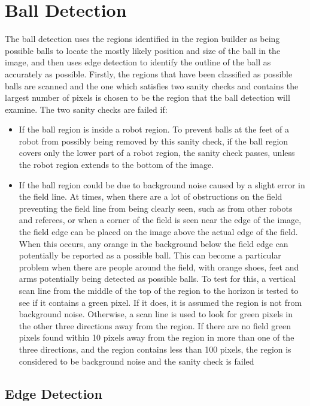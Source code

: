 \documentclass[pdftex,11pt,a4paper]{report}
\begin{document}
\section{Ball Detection} \label{sectionBallDetection}
The ball detection uses the regions identified in the region builder as being possible balls to locate the mostly likely position and size of the ball in the image, and then uses edge detection to identify the outline of the ball as accurately as possible. Firstly, the regions that have been classified as possible balls are scanned and the one which satisfies two sanity checks and contains the largest number of pixels is chosen to be the region that the ball detection will examine. The two sanity checks are failed if: \begin{itemize}
\item{If the ball region is inside a robot region. To prevent balls at the feet of a robot from possibly being removed by this sanity check, if the ball region covers only the lower part of a robot region, the sanity check passes, unless the robot region extends to the bottom of the image.}
\item{If the ball region could be due to background noise caused by a slight error in the field line. At times, when there are a lot of obstructions on the field preventing the field line from being clearly seen, such as from other robots and referees, or when a corner of the field is seen near the edge of the image, the field edge can be placed on the image above the actual edge of the field. When this occurs, any orange in the background below the field edge can potentially be reported as a possible ball. This can become a particular problem when there are people around the field, with orange shoes, feet and arms potentially being detected as possible balls. To test for this, a vertical scan line from the middle of the top of the region to the horizon is tested to see if it contains a green pixel. If it does, it is assumed the region is not from background noise. Otherwise, a scan line is used to look for green pixels in the other three directions away from the region. If there are no field green pixels found within 10 pixels away from the region in more than one of the three directions, and the region contains less than 100 pixels, the region is considered to be background noise and the sanity check is failed}
\end{itemize}

\subsection{Edge Detection}
\end{document}
